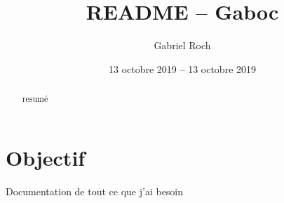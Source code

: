 \documentclass[a4paper,11pt]{article}
\title{README -- Gaboc}
\author{Gabriel Roch}
\date{13 octobre 2019 -- 13 octobre 2019}
\begin{document}
\maketitle
\tableofcontents

\begin{abstract}
  resumé
\end{abstract}

\section{Objectif}

Documentation de tout ce que j'ai besoin
\end{document}
